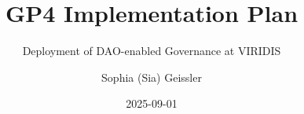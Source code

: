 \documentclass[
  english,
  12pt,
  oneside,
  open=any]{scrbook}
\title{GP4 Implementation Plan}
\subtitle{Deployment of DAO-enabled Governance at VIRIDIS}
\author{Sophia (Sia) Geissler}
\date{2025-09-01}
\begin{document}

  \begin{frontmatter}

\begin{titlepage}


\newcommand{\titlepagepagealign}{
\ifthenelse{\equal{left}{right}}{\raggedleft}{}
\ifthenelse{\equal{left}{center}}{\centering}{}
\ifthenelse{\equal{left}{left}}{\raggedright}{}
}


\newcommand{\titleandsubtitle}{
{{\large{\bfseries{\nohyphens{GP4 Implementation Plan}}}}\par
}%

\vspace{\betweentitlesubtitle}
{
{\large{\textit{\nohyphens{Deployment of DAO-enabled Governance at
VIRIDIS}}}}\par
}}
\newcommand{\titlepagetitleblock}{
\titleandsubtitle
}

\newcommand{\authorstyle}[1]{{\large{#1}}}

\newcommand{\affiliationstyle}[1]{{\large{#1}}}

\newcommand{\titlepageauthorblock}{
{\authorstyle{\nohyphens{Sophia (Sia) Geissler}{\textsuperscript{1}}}}}

\newcommand{\titlepageaffiliationblock}{
\hangindent=1em
\hangafter=1
{\affiliationstyle{
{1}.~Inholland University of Applied Sciences,~Haarlem, The Netherlands


\vspace{1\baselineskip} 
}}
}
\newcommand{\headerstyled}{%
{Graduation Project 4}
}
\newcommand{\footerstyled}{%
{\large{Inholland University of Applied Sciences\\
GP4 Implementation Plan\\
VIRIDIS --- Green Tech Investment AG}}
}
\newcommand{\datestyled}{%
{2025-09-01}
}


\newcommand{\titlepageheaderblock}{\headerstyled}

\newcommand{\titlepagefooterblock}{
\footerstyled
}

\newcommand{\titlepagedateblock}{
\datestyled
}

\newcommand{\titleblock}{\newlength{\betweentitlesubtitle}
\setlength{\betweentitlesubtitle}{\baselineskip}
{

{\titlepagetitleblock}
}

\vspace{4\baselineskip}
}


\end{titlepage}
\end{frontmatter}
\end{document}
